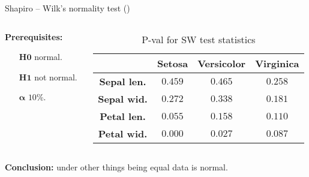 \documentclass[11pt, aspectratio=169]{beamer}
\newcommand{\emphtext}[1]{\color{black} \textbf{#1}}
\begin{document}
    \begin{frame}{Shapiro -- Wilk's normality test (\cite{razali2011power})}
    	\begin{columns}
    		\begin{column}{0.2\textwidth}
    			\noindent \emphtext{Prerequisites:}\\[10pt]
    			\begin{itemize}
    				\item[\emphtext{H$\bm{0}$}] normal.\\[10pt]
    				\item[\emphtext{H$\bm{1}$}] not normal.\\[10pt]
    				\item[\emphtext{$\bm{\alpha}$}] $10\%$.\\[10pt]
    			\end{itemize}
    		\end{column}
    		\begin{column}{0.8\textwidth}
				\begin{table}[H]
					\begin{tabular}{cccc}
						\toprule
						 & \emphtext{Setosa} & \emphtext{Versicolor} & \emphtext{Virginica}\\
						 \midrule[0.02cm]
						 \emphtext{Sepal len.} & $0.459$ & $0.465$ & $0.258$\\[0.1cm]
						 \emphtext{Sepal wid.} & $0.272$ & $0.338$ & $0.181$\\[0.1cm]
						 \emphtext{Petal len.} & {\color{red}$0.055$} & $0.158$ & $0.110$\\[0.1cm]
						 \emphtext{Petal wid.} & {\color{red}$0.000$} & {\color{red}$0.027$} & {\color{red}$0.087$}\\[0.1cm]
						\midrule[0.02cm]
					\end{tabular}
					\caption{P-val for SW test statistics}
				\end{table}
			\end{column}
    	\end{columns}
    	\noindent \emphtext{Conclusion:} under other things being equal data is normal.
    \end{frame}
    
\end{document}
